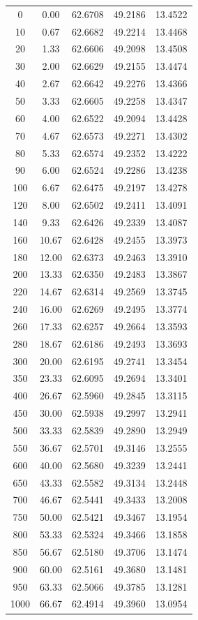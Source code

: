 \documentclass[12pt]{article}
\begin{document}
\begin{longtable}{ccccc}
        0 & 0.00  & 62.6708  & 49.2186  & 13.4522  \\
    10 & 0.67  & 62.6682  & 49.2214  & 13.4468  \\
    20 & 1.33  & 62.6606  & 49.2098  & 13.4508  \\
    30 & 2.00  & 62.6629  & 49.2155  & 13.4474  \\
    40 & 2.67  & 62.6642  & 49.2276  & 13.4366  \\
    50 & 3.33  & 62.6605  & 49.2258  & 13.4347  \\
    60 & 4.00  & 62.6522  & 49.2094  & 13.4428  \\
    70 & 4.67  & 62.6573  & 49.2271  & 13.4302  \\
    80 & 5.33  & 62.6574  & 49.2352  & 13.4222  \\
    90 & 6.00  & 62.6524  & 49.2286  & 13.4238  \\
    100 & 6.67  & 62.6475  & 49.2197  & 13.4278  \\
    120 & 8.00  & 62.6502  & 49.2411  & 13.4091  \\
    140 & 9.33  & 62.6426  & 49.2339  & 13.4087  \\
    160 & 10.67  & 62.6428  & 49.2455  & 13.3973  \\
    180 & 12.00  & 62.6373  & 49.2463  & 13.3910  \\
    200 & 13.33  & 62.6350  & 49.2483  & 13.3867  \\
    220 & 14.67  & 62.6314  & 49.2569  & 13.3745  \\
    240 & 16.00  & 62.6269  & 49.2495  & 13.3774  \\
    260 & 17.33  & 62.6257  & 49.2664  & 13.3593  \\
    280 & 18.67  & 62.6186  & 49.2493  & 13.3693  \\
    300 & 20.00  & 62.6195  & 49.2741  & 13.3454  \\
    350 & 23.33  & 62.6095  & 49.2694  & 13.3401  \\
    400 & 26.67  & 62.5960  & 49.2845  & 13.3115  \\
    450 & 30.00  & 62.5938  & 49.2997  & 13.2941  \\
    500 & 33.33  & 62.5839  & 49.2890  & 13.2949  \\
    550 & 36.67  & 62.5701  & 49.3146  & 13.2555  \\
    600 & 40.00  & 62.5680  & 49.3239  & 13.2441  \\
    650 & 43.33  & 62.5582  & 49.3134  & 13.2448  \\
    700 & 46.67  & 62.5441  & 49.3433  & 13.2008  \\
    750 & 50.00  & 62.5421  & 49.3467  & 13.1954  \\
    800 & 53.33  & 62.5324  & 49.3466  & 13.1858  \\
    850 & 56.67  & 62.5180  & 49.3706  & 13.1474  \\
    900 & 60.00  & 62.5161  & 49.3680  & 13.1481  \\
    950 & 63.33  & 62.5066  & 49.3785  & 13.1281  \\
    1000 & 66.67  & 62.4914  & 49.3960  & 13.0954  \\


\end{longtable}
\end{document}
